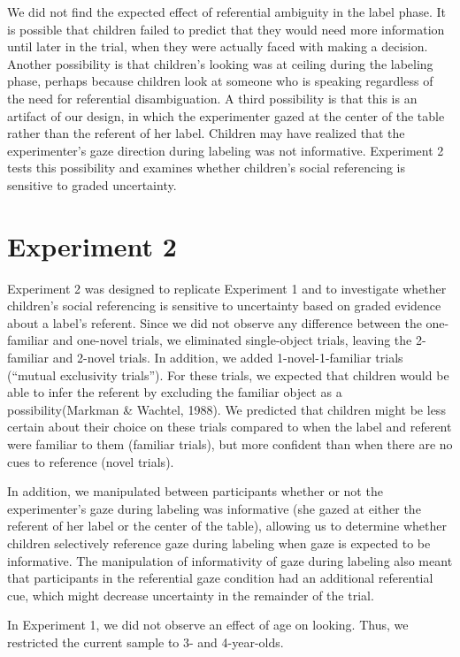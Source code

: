 \documentclass[10pt, letterpaper]{article}
\begin{document}
We did not find the expected effect of referential ambiguity in the
label phase. It is possible that children failed to predict that they
would need more information until later in the trial, when they were
actually faced with making a decision. Another possibility is that
children's looking was at ceiling during the labeling phase, perhaps
because children look at someone who is speaking regardless of the need
for referential disambiguation. A third possibility is that this is an
artifact of our design, in which the experimenter gazed at the center of
the table rather than the referent of her label. Children may have
realized that the experimenter's gaze direction during labeling was not
informative. Experiment 2 tests this possibility and examines whether
children's social referencing is sensitive to graded uncertainty.

\section{Experiment 2}\label{experiment-2}

Experiment 2 was designed to replicate Experiment 1 and to investigate
whether children's social referencing is sensitive to uncertainty based
on graded evidence about a label's referent. Since we did not observe
any difference between the one-familiar and one-novel trials, we
eliminated single-object trials, leaving the 2-familiar and 2-novel
trials. In addition, we added 1-novel-1-familiar trials (``mutual
exclusivity trials''). For these trials, we expected that children would
be able to infer the referent by excluding the familiar object as a
possibility(Markman \& Wachtel, 1988). We predicted that children might
be less certain about their choice on these trials compared to when the
label and referent were familiar to them (familiar trials), but more
confident than when there are no cues to reference (novel trials).

In addition, we manipulated between participants whether or not the
experimenter's gaze during labeling was informative (she gazed at either
the referent of her label or the center of the table), allowing us to
determine whether children selectively reference gaze during labeling
when gaze is expected to be informative. The manipulation of
informativity of gaze during labeling also meant that participants in
the referential gaze condition had an additional referential cue, which
might decrease uncertainty in the remainder of the trial.

In Experiment 1, we did not observe an effect of age on looking. Thus,
we restricted the current sample to 3- and 4-year-olds.
\end{document}
